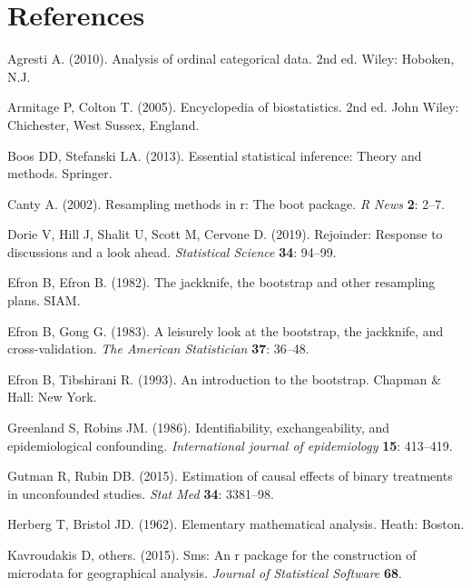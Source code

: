 \documentclass[]{article}
\begin{document}
\hypertarget{references}{%
\section*{References}\label{references}}

\hypertarget{refs}{}
\leavevmode\hypertarget{ref-Agresti2010}{}%
Agresti A. (2010). Analysis of ordinal categorical data. 2nd ed. Wiley:
Hoboken, N.J.

\leavevmode\hypertarget{ref-Armi2005}{}%
Armitage P, Colton T. (2005). Encyclopedia of biostatistics. 2nd ed.
John Wiley: Chichester, West Sussex, England.

\leavevmode\hypertarget{ref-Boos2013}{}%
Boos DD, Stefanski LA. (2013). Essential statistical inference: Theory
and methods. Springer.

\leavevmode\hypertarget{ref-boostrap2003}{}%
Canty A. (2002). Resampling methods in r: The boot package. \emph{R
News} \textbf{2}: 2--7.

\leavevmode\hypertarget{ref-Dorie_2019}{}%
Dorie V, Hill J, Shalit U, Scott M, Cervone D. (2019). Rejoinder:
Response to discussions and a look ahead. \emph{Statistical Science}
\textbf{34}: 94--99.

\leavevmode\hypertarget{ref-efron1982}{}%
Efron B, Efron B. (1982). The jackknife, the bootstrap and other
resampling plans. SIAM.

\leavevmode\hypertarget{ref-efron1983}{}%
Efron B, Gong G. (1983). A leisurely look at the bootstrap, the
jackknife, and cross-validation. \emph{The American Statistician}
\textbf{37}: 36--48.

\leavevmode\hypertarget{ref-Efron1993}{}%
Efron B, Tibshirani R. (1993). An introduction to the bootstrap. Chapman
\& Hall: New York.

\leavevmode\hypertarget{ref-robins1986}{}%
Greenland S, Robins JM. (1986). Identifiability, exchangeability, and
epidemiological confounding. \emph{International journal of
epidemiology} \textbf{15}: 413--419.

\leavevmode\hypertarget{ref-Gutman2015}{}%
Gutman R, Rubin DB. (2015). Estimation of causal effects of binary
treatments in unconfounded studies. \emph{Stat Med} \textbf{34}:
3381--98.

\leavevmode\hypertarget{ref-Herberg1962}{}%
Herberg T, Bristol JD. (1962). Elementary mathematical analysis. Heath:
Boston.

\leavevmode\hypertarget{ref-kavroudakis2015}{}%
Kavroudakis D, others. (2015). Sms: An r package for the construction of
microdata for geographical analysis. \emph{Journal of Statistical
Software} \textbf{68}.
\end{document}
